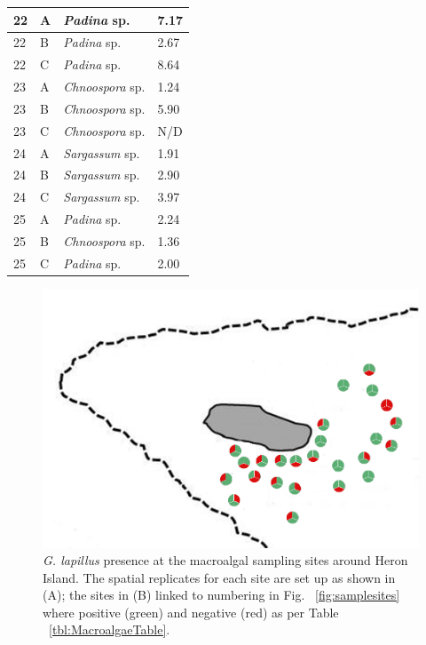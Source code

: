 \documentclass[12pt]{article}
\begin{document}
\begin{longtable}{ | p{2cm} | p{2cm} | p{3cm} | p{3.5cm} |}
\hline
22
&A&\emph{Padina} sp.&7.17\\
\hline
22
&B&\emph{Padina} sp.&2.67\\
\hline
22
&C&\emph{Padina} sp.&8.64\\
\hline
23&A&\emph{Chnoospora }sp.&1.24
\\
\hline
23&B&\emph{Chnoospora }sp.&5.90
\\
\hline
23&C&\emph{Chnoospora} sp.&N/D\\
\hline
24&A&\emph{Sargassum} sp.&1.91
\\
\hline
24&B&\emph{Sargassum} sp.&2.90
\\
\hline
24&C&\emph{Sargassum} sp.&3.97
\\
\hline
25&A&\emph{Padina} sp.%
&2.24
\\
\hline
25&B&\emph{Chnoospora }sp.%
&1.36
\\
\hline
25&C&\emph{Padina} sp.%
&2.00
\\
\hline
\end{longtable}
\FloatBarrier
\begin{figure} 
\includegraphics[scale=2.5]{Hero_qpcr-figs/Fig4_Heron-positive-negative-samplingsites_Nov18.png} 
\caption{\emph{G. lapillus} presence at the macroalgal sampling sites around Heron Island. The spatial replicates for each site are set up as shown in (A); the sites in (B) linked to numbering in Fig. ~\ref{fig:samplesites} where positive (green) and negative (red) as per Table ~\ref{tbl:MacroalgaeTable}.} 
\label{fig:envposneg}
\end{figure} 
 
\end{document}
